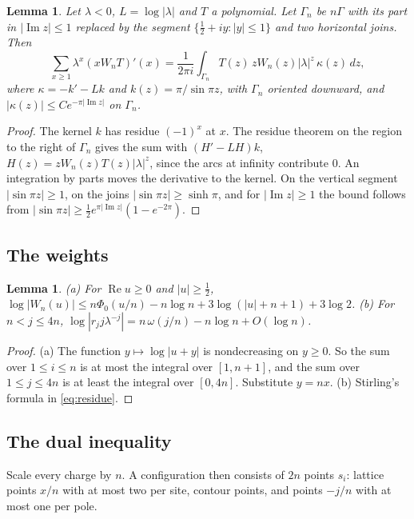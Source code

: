 \documentclass[11pt]{amsart}
\newtheorem{lemma}[theorem]{Lemma}
\theoremstyle{definition}
\theoremstyle{remark}
\numberwithin{equation}{section}
\begin{document}
\begin{lemma}\label{lem:contour}
Let $\lambda<0$, $L=\log|\lambda|$ and $T$ a polynomial. Let $\Gamma_n$ be $n\Gamma$ with its part in
$|\operatorname{Im}z|\le1$ replaced by the segment $\{\frac12+iy:|y|\le1\}$ and two horizontal joins. Then
\[
 \sum_{x\ge1}\lambda^x(xW_nT)'(x)=\frac1{2\pi i}\int_{\Gamma_n}T(z)\,zW_n(z)|\lambda|^z\,\kappa(z)\,dz,
\]
where $\kappa=-k'-Lk$ and $k(z)=\pi/\sin\pi z$,
with $\Gamma_n$ oriented downward, and $|\kappa(z)|\le Ce^{-\pi|\operatorname{Im}z|}$ on $\Gamma_n$.
\end{lemma}

\begin{proof}
The kernel $k$ has residue $(-1)^x$ at $x$. The residue theorem on the region to the right of $\Gamma_n$ gives the sum
with $(H'-LH)k$, $H(z)=zW_n(z)T(z)|\lambda|^z$, since the arcs at infinity contribute $0$. An integration by parts
moves the derivative to the kernel. On the vertical segment $|\sin\pi z|\ge1$, on the joins $|\sin\pi z|\ge\sinh\pi$,
and for $|\operatorname{Im}z|\ge1$ the bound follows from $|\sin\pi z|\ge\frac12e^{\pi|\operatorname{Im}z|}(1-e^{-2\pi})$.
\end{proof}

\subsection{The weights}
\begin{lemma}\label{lem:weights}
(a) For $\operatorname{Re}u\ge0$ and $|u|\ge\frac12$,
$\log|W_n(u)|\le n\Phi_0(u/n)-n\log n+3\log(|u|+n+1)+3\log2$.
(b) For $n<j\le4n$, $\log|r_jj\lambda^{-j}|=n\,\omega(j/n)-n\log n+O(\log n)$.
\end{lemma}

\begin{proof}
(a) The function $y\mapsto\log|u+y|$ is nondecreasing on $y\ge0$. So the sum over $1\le i\le n$ is at most the
integral over $[1,n+1]$, and the sum over $1\le j\le4n$ is at least the integral over $[0,4n]$. Substitute $y=nx$.
(b) Stirling's formula in \eqref{eq:residue}.
\end{proof}

\subsection{The dual inequality}
Scale every charge by $n$. A configuration then consists of $2n$ points $s_i$: lattice points $x/n$ with at most two
per site, contour points, and points $-j/n$ with at most one per pole.
\end{document}
